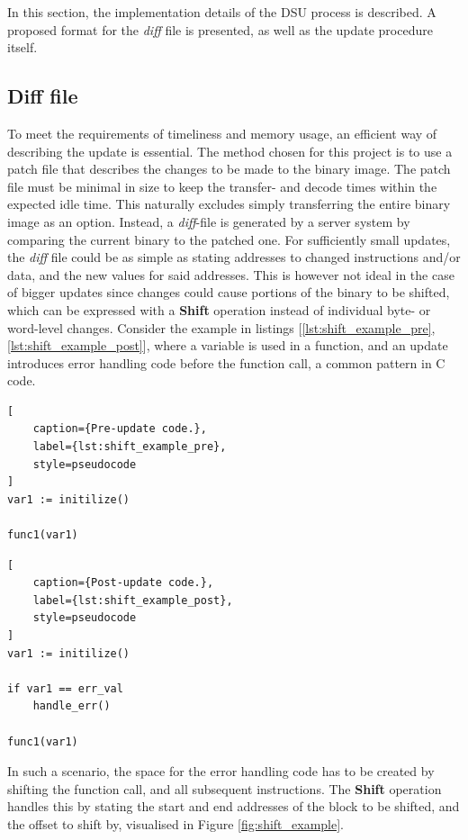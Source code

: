 In this section, the implementation details of the DSU process is described. A proposed format for the \textit{diff} file is presented, as well as the update procedure itself. 
\subsection{Diff file}\label{sec:patchfile}
To meet the requirements of timeliness and memory usage, an efficient way of describing the update is essential. The method chosen for this project is to use a patch file that describes the changes to be made to the binary image.
The patch file must be minimal in size to keep the transfer- and decode times within the expected idle time. This naturally excludes simply transferring the entire binary image as an option. Instead, a \textit{\textit{diff}}-file is generated by a server system by comparing the current binary to the patched one. For sufficiently small updates, the \textit{diff} file could be as simple as stating addresses to changed instructions and/or data, and the new values for said addresses. This is however not ideal in the case of bigger updates since changes could cause portions of the binary to be shifted, which can be expressed with a \textbf{Shift} operation instead of individual byte- or word-level changes. Consider the example in listings [\ref{lst:shift_example_pre}, \ref{lst:shift_example_post}], where a variable is used in a function, and an update introduces error handling code before the function call, a common pattern in C code.

\noindent\begin{minipage}{0.45\textwidth}
\begin{lstlisting}[
    caption={Pre-update code.},
    label={lst:shift_example_pre},
    style=pseudocode
]
var1 := initilize()

func1(var1)
\end{lstlisting}
\end{minipage}\hfill
\noindent\begin{minipage}{0.45\textwidth}
\begin{lstlisting}[
    caption={Post-update code.},
    label={lst:shift_example_post},
    style=pseudocode
]
var1 := initilize()

if var1 == err_val
    handle_err()

func1(var1)
\end{lstlisting}
\end{minipage}

In such a scenario, the space for the error handling code has to be created by shifting the function call, and all subsequent instructions. The \textbf{Shift} operation handles this by stating the start and end addresses of the block to be shifted, and the offset to shift by, visualised in Figure \ref{fig:shift_example}. 

